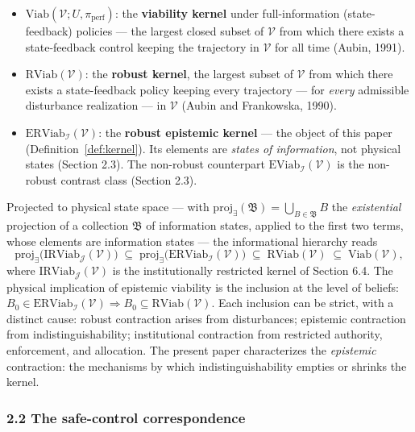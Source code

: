 \documentclass[11pt]{article}
\theoremstyle{definition}
\providecommand{\tightlist}{\setlength{\itemsep}{0pt}\setlength{\parskip}{0pt}}
\begin{document}
\begin{itemize}
\tightlist
\item
  \(\mathrm{Viab}(\mathcal{V}; U, \pi_{\mathrm{perf}})\): the
  \textbf{viability kernel} under full-information (state-feedback)
  policies --- the largest closed subset of \(\mathcal{V}\) from which
  there exists a state-feedback control keeping the trajectory in
  \(\mathcal{V}\) for all time (Aubin, 1991).
\item
  \(\mathrm{RViab}(\mathcal{V})\): the \textbf{robust kernel}, the
  largest subset of \(\mathcal{V}\) from which there exists a
  state-feedback policy keeping every trajectory --- for \emph{every}
  admissible disturbance realization --- in \(\mathcal{V}\) (Aubin and
  Frankowska, 1990).
\item
  \(\mathrm{ERViab}_{\mathcal{I}}(\mathcal{V})\): the \textbf{robust
  epistemic kernel} --- the object of this paper (Definition~\ref{def:kernel}). Its
  elements are \emph{states of information}, not physical states
  (Section 2.3). The non-robust counterpart
  \(\mathrm{EViab}_{\mathcal{I}}(\mathcal{V})\) is the non-robust contrast class (Section 2.3).
\end{itemize}

Projected to physical state space --- with
\(\mathrm{proj}_{\exists}(\mathfrak{B}) = \bigcup_{B \in \mathfrak{B}} B\)
the \emph{existential} projection of a collection \(\mathfrak{B}\) of
information states, applied to the first two terms, whose elements are information states --- the informational hierarchy
reads
\[\mathrm{proj}_{\exists}\big(\mathrm{IRViab}_{\mathcal{J}}(\mathcal{V})\big) \;\subseteq\; \mathrm{proj}_{\exists}\big(\mathrm{ERViab}_{\mathcal{I}}(\mathcal{V})\big) \;\subseteq\; \mathrm{RViab}(\mathcal{V}) \;\subseteq\; \mathrm{Viab}(\mathcal{V}),\]
where \(\mathrm{IRViab}_{\mathcal{J}}(\mathcal{V})\) is the institutionally restricted kernel of Section 6.4. The physical implication of epistemic viability is the
inclusion at the level of beliefs:
\(B_0 \in \mathrm{ERViab}_{\mathcal{I}}(\mathcal{V}) \Rightarrow B_0 \subseteq \mathrm{RViab}(\mathcal{V})\).
Each inclusion can be strict, with a distinct cause: robust contraction
arises from disturbances; epistemic contraction from
indistinguishability; institutional contraction from restricted
authority, enforcement, and allocation. The present paper characterizes
the \emph{epistemic} contraction: the mechanisms by which
indistinguishability empties or shrinks the kernel.

\subsubsection{2.2 The safe-control
correspondence}\label{the-safe-control-correspondence}
\end{document}

